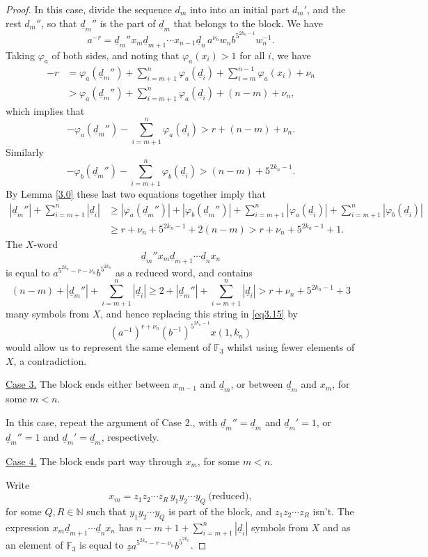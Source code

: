\documentclass[10pt,a4paper]{amsart}
\newcommand {\N}{\mathbb N}
\newcommand{\F}{\mathbb F}
\newcommand{\pdt}{\underline}
\begin{document}
\begin{proof}
		In this case, divide the sequence $d_m$ into into an initial part $d_m'$, and the rest $d_m''$, so that $\pdt{d}_m''$ is the part of $\pdt{d}_m$ that belongs to the block. We have
		$$ a^{-r} = \pdt{d}_m''x_m \pdt{d}_{m+1} \cdots x_{n-1} \pdt{d}_n \, a^{\nu_n} w_n b^{5^{2k_n-1}} w_n^{-1}.$$
		Taking $\varphi_a$ of both sides, and noting that $\varphi_a(x_i) > 1$ for all $i$, we have
		\begin{align*}
			-r &= \varphi_a(\pdt{d}_m'')  +\sum_{i = m+1}^n \varphi_a(\pdt{d}_i) 
			+\sum_{i=m}^{n-1} \varphi_a(x_i) + \nu_n\\
			&> \varphi_a(\pdt{d}_m'')  +\sum_{i = m+1}^n \varphi_a(\pdt{d}_i) + (n-m) +\nu_n,
		\end{align*}
		which implies that
		$$ -\varphi_a(\pdt{d}_m'')  - \sum_{i = m+1}^n \varphi_a(\pdt{d}_i) > r +(n-m) +\nu_n.$$
		Similarly
		$$ -\varphi_b(\pdt{d}_m'')  -\sum_{i = m+1}^n \varphi_b(\pdt{d}_i) > (n-m) + 5^{2k_n-1}.$$
		By Lemma \ref{3.0} these last two equations together imply that  
		\begin{align*}
			|\pdt{d}_m''| + \sum_{i=m+1}^n |\pdt{d}_i | &\geq
			|\varphi_a(\pdt{d}_m'')| + |\varphi_b(\pdt{d}_m'')| + \sum_{i=m+1}^n |\varphi_a(\pdt{d}_i)| +  \sum_{i=m+1}^n |\varphi_b(\pdt{d}_i)|\\
			&\geq r+ \nu_n  + 5^{2k_n-1} + 2(n-m)> r + \nu_n +  5^{2k_n-1} + 1.
		\end{align*}
		The $X$-word
		$$\pdt{d}_m''x_m \pdt{d}_{m+1} \cdots \pdt{d}_n x_n$$
		is equal to $a^{5^{2k_n}-r - \nu_n}b^{5^{2k_n}}$ as a reduced word, and contains 
		$$(n-m) + |\pdt{d}_m''| + \sum_{i=m+1}^n |\pdt{d}_i | \geq 2 + |\pdt{d}_m''| + \sum_{i=m+1}^n |\pdt{d}_i | > r + \nu_n + 5^{2k_n-1} + 3$$
		many symbols from $X$,
		and hence replacing this string in \eqref{eq3.15} by
		$$(a^{-1})^{r +\nu_n} (b^{-1})^{5^{2k_n-1}} x(1,k_n)$$
		would allow us to represent the same element of $\F_3$ whilst using fewer elements of $X$, a contradiction.
		
		\vskip 2mm
		\noindent
		\underline{Case 3.} The block ends either between $x_{m-1}$ and $\pdt{d}_m$, or between $\pdt{d}_m$ and $x_m$, for some $m<n$.
		
		In this case, repeat the argument of Case 2., with $\pdt{d}_m'' = \pdt{d}_m$ and $\pdt{d}_m' = 1$, or $\pdt{d}_m'' = 1$ and $\pdt{d}_m' = \pdt{d}_m$, respectively.
		
		\vskip 2mm
		\noindent
		\underline{Case 4.} The block ends part way through $x_m$, for some $m<n$.
		
		Write 
		$$x_m = z_1z_2 \cdots z_R \, y_1 y_2 \cdots y_Q \ \text{(reduced)},$$
		for some $Q, R \in \N$ such that $y_1 y_2 \cdots y_Q$ is part of the block, and $z_1 z_2 \cdots z_R$ isn't. 
		The expression $x_m \pdt{d}_{m+1} \cdots \pdt{d}_n x_n$ has $n-m + 1 + \sum_{i=m+1}^n |\pdt{d}_i|$ symbols from $X$ and as an element of $\F_3$ is equal to $\pdt{z} a^{5^{2k_n}- r- \nu_n}b^{5^{2k_n}}$.
		

\end{proof}
\end{document}
